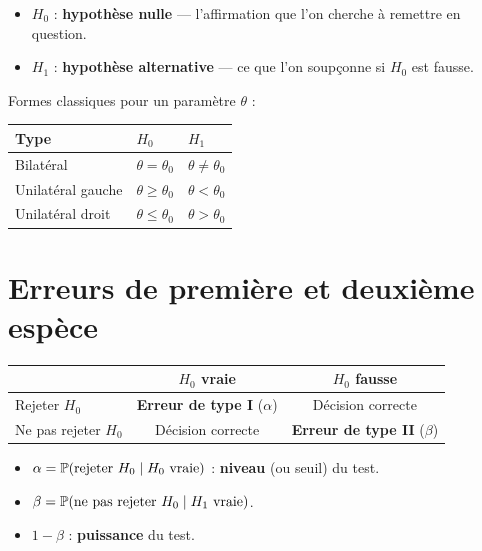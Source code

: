 \begin{definition}
\begin{itemize}
\item $H_0$ : \textbf{hypoth\`ese nulle} --- l'affirmation que l'on cherche \`a remettre en question.
\item $H_1$ : \textbf{hypoth\`ese alternative} --- ce que l'on soupçonne si $H_0$ est fausse.
\end{itemize}
Formes classiques pour un param\`etre $\theta$ :
\begin{center}
\begin{tabular}{lll}
\toprule
\textbf{Type} & $H_0$ & $H_1$ \\
\midrule
Bilat\'eral & $\theta=\theta_0$ & $\theta\neq\theta_0$ \\
Unilat\'eral gauche & $\theta\geq\theta_0$ & $\theta<\theta_0$ \\
Unilat\'eral droit & $\theta\leq\theta_0$ & $\theta>\theta_0$ \\
\bottomrule
\end{tabular}
\end{center}
\end{definition}

\section{Erreurs de premi\`ere et deuxi\`eme esp\`ece}

\begin{definition}
\begin{center}
\begin{tabular}{l|cc}
& $H_0$ vraie & $H_0$ fausse \\
\hline
Rejeter $H_0$ & \textbf{Erreur de type I} ($\alpha$) & D\'ecision correcte \\
Ne pas rejeter $H_0$ & D\'ecision correcte & \textbf{Erreur de type II} ($\beta$) \\
\end{tabular}
\end{center}
\begin{itemize}
\item $\alpha = \mathbb{P}(\text{rejeter } H_0\mid H_0 \text{ vraie})$ : \textbf{niveau} (ou seuil) du test.
\item $\beta = \mathbb{P}(\text{ne pas rejeter } H_0\mid H_1 \text{ vraie})$.
\item $1-\beta$ : \textbf{puissance} du test.
\end{itemize}
\end{definition}


